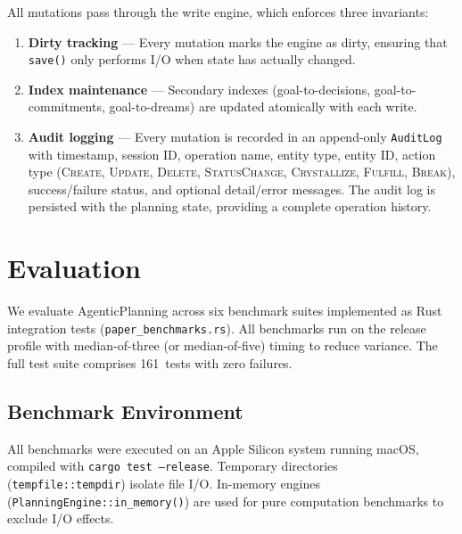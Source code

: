 \documentclass[10pt, twocolumn]{article}
\begin{document}
All mutations pass through the write engine, which enforces three invariants:

\begin{enumerate}[nosep, leftmargin=*]
  \item \textbf{Dirty tracking} --- Every mutation marks the engine as dirty, ensuring that \texttt{save()} only performs I/O when state has actually changed.
  \item \textbf{Index maintenance} --- Secondary indexes (goal-to-decisions, goal-to-commitments, goal-to-dreams) are updated atomically with each write.
  \item \textbf{Audit logging} --- Every mutation is recorded in an append-only \texttt{AuditLog} with timestamp, session ID, operation name, entity type, entity ID, action type (\textsc{Create}, \textsc{Update}, \textsc{Delete}, \textsc{StatusChange}, \textsc{Crystallize}, \textsc{Fulfill}, \textsc{Break}), success/failure status, and optional detail/error messages. The audit log is persisted with the planning state, providing a complete operation history.
\end{enumerate}


\section{Evaluation}
\label{sec:evaluation}

We evaluate AgenticPlanning across six benchmark suites implemented as Rust integration tests (\texttt{paper\_benchmarks.rs}). All benchmarks run on the release profile with median-of-three (or median-of-five) timing to reduce variance. The full test suite comprises 161~tests with zero failures.

\subsection{Benchmark Environment}
\label{sec:bench_env}

All benchmarks were executed on an Apple Silicon system running macOS, compiled with \texttt{cargo test --release}. Temporary directories (\texttt{tempfile::tempdir}) isolate file I/O. In-memory engines (\texttt{PlanningEngine::in\_memory()}) are used for pure computation benchmarks to exclude I/O effects.
\end{document}
